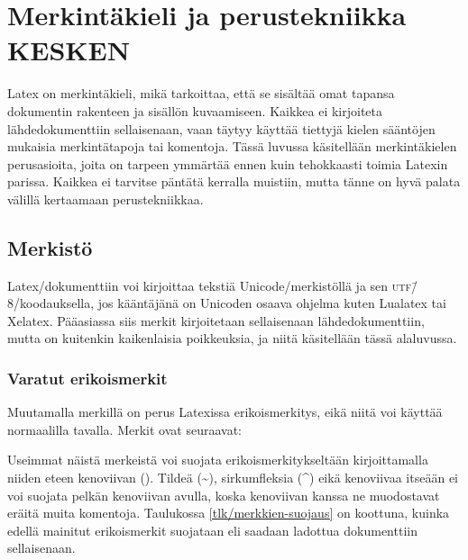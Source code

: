
\chapter{Merkintäkieli ja perustekniikka KESKEN}

Latex on merkintäkieli, mikä tarkoittaa, että se sisältää omat tapansa
dokumentin rakenteen ja sisällön kuvaamiseen. Kaikkea ei kirjoiteta
lähdedokumenttiin sellaisenaan, vaan täytyy käyttää tiettyjä kielen
sääntöjen mukaisia merkintätapoja tai komentoja. Tässä luvussa
käsitellään merkintäkielen perusasioita, joita on tarpeen ymmärtää ennen
kuin tehokkaasti toimia Latexin parissa. Kaikkea ei tarvitse päntätä
kerralla muistiin, mutta tänne on hyvä palata välillä kertaamaan
perustekniikkaa.

\section{Merkistö}

Latex\-/dokumenttiin voi kirjoittaa tekstiä Unicode\-/merkistöllä ja sen
\textsc{utf}\=/8\-/koodauksella, jos kääntäjänä on Unicoden osaava
ohjelma kuten Lualatex tai Xelatex. Pääasiassa siis merkit kirjoitetaan
sellaisenaan lähdedokumenttiin, mutta on kuitenkin kaikenlaisia
poikkeuksia, ja niitä käsitellään tässä alaluvussa.

\subsection{Varatut erikoismerkit}

Muutamalla merkillä on perus Latexissa erikoismerkitys, eikä niitä voi
käyttää normaalilla tavalla. Merkit ovat seuraavat:

\begin{koodilohkosis}
\end{koodilohkosis}

\noindent
Useimmat näistä merkeistä voi suojata erikoismerkitykseltään
kirjoittamalla niiden eteen kenoviivan (\koodi{\keno}). Tildeä
(\textasciitilde), sirkumfleksia (\textasciicircum) eikä kenoviivaa
itseään ei voi suojata pelkän kenoviivan avulla, koska kenoviivan kanssa
ne muodostavat eräitä muita komentoja. Taulukossa
\ref{tlk/merkkien-suojaus} on koottuna, kuinka edellä mainitut
erikoismerkit suojataan eli saadaan ladottua dokumenttiin sellaisenaan.

